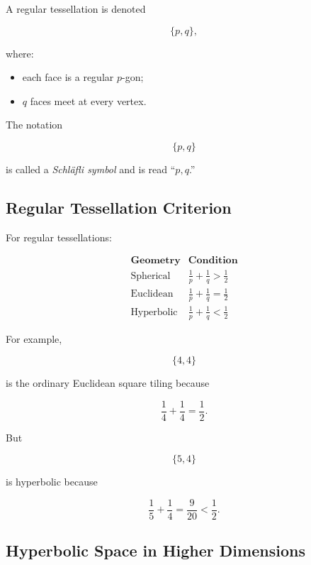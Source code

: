 A regular tessellation is denoted

\[
\{p,q\},
\]

where:

\begin{itemize}
    \item each face is a regular \(p\)-gon;
    \item \(q\) faces meet at every vertex.
\end{itemize}

The notation

\[
\{p,q\}
\]

is called a \emph{Schl\"afli symbol} and is read ``\(p,q\).''

\subsection{Regular Tessellation Criterion}
\label{subsec:regular-tessellation-criterion}

For regular tessellations:

\[
\boxed{
\begin{array}{c|c}
\textbf{Geometry} &
\textbf{Condition}\\
\hline
\text{Spherical} &
\frac1p+\frac1q>\frac12\\[2mm]
\text{Euclidean} &
\frac1p+\frac1q=\frac12\\[2mm]
\text{Hyperbolic} &
\frac1p+\frac1q<\frac12
\end{array}
}
\]

For example,

\[
\{4,4\}
\]

is the ordinary Euclidean square tiling because

\[
\frac14+\frac14=\frac12.
\]

But

\[
\{5,4\}
\]

is hyperbolic because

\[
\frac15+\frac14
=
\frac{9}{20}
<
\frac12.
\]

\subsection{Hyperbolic Space in Higher Dimensions}
\label{subsec:higher-dimensional-hyperbolic-space}


